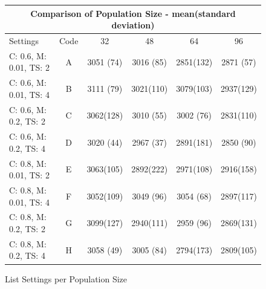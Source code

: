 \begin{figure}[!h]
	\centering
\begin{tabular}{ |l|c||c|c|c|c|  }
	\hline
	\multicolumn{6}{|c|}{Comparison of Population Size - mean(standard deviation)} \\
	\hline
	Settings & Code & 32 & 48 & 64 & 96\\
	\hline
	C: 0.6, M: 0.01, TS: 2   	& A & 3051 (74) & 3016 (85) & 2851(132) & 2871 (57)\\
	C: 0.6, M: 0.01, TS: 4		& B & 3111 (79) & 3021(110) & 3079(103) & 2937(129)\\
	C: 0.6, M: 0.2, TS: 2 		& C & 3062(128) & 3010 (55) & 3002 (76) & 2831(110)\\
	C: 0.6, M: 0.2, TS: 4    	& D & \cellcolor{green}3020 (44) & 2967 (37) & 2891(181) & 2850 (90)\\
	C: 0.8, M: 0.01, TS: 2   	& E & 3063(105) & \cellcolor{green}2892(222) & 2971(108) & 2916(158)\\
	C: 0.8, M: 0.01, TS: 4		& F & 3052(109) & 3049 (96) & 3054 (68) & 2897(117)\\
	C: 0.8, M: 0.2, TS: 2 		& G & 3099(127) & 2940(111) & 2959 (96) & 2869(131)\\
	C: 0.8, M: 0.2, TS: 4    	& H & 3058 (49) & 3005 (84) & \cellcolor{green}2794(173) & \cellcolor{green}2809(105)\\
	\hline
\end{tabular}
\caption{List Settings per Population Size}
\end{figure}


